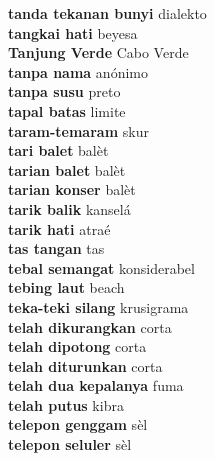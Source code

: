 \textbf{ tanda tekanan bunyi  } dialekto \\
\textbf{ tangkai hati  } beyesa \\
\textbf{ Tanjung Verde  } Cabo Verde \\
\textbf{ tanpa nama  } anónimo \\
\textbf{ tanpa susu  } preto \\
\textbf{ tapal batas  } limite \\
\textbf{ taram-temaram  } skur \\
\textbf{ tari balet  } balèt \\
\textbf{ tarian balet  } balèt \\
\textbf{ tarian konser  } balèt \\
\textbf{ tarik balik  } kanselá \\
\textbf{ tarik hati  } atraé \\
\textbf{ tas tangan  } tas \\
\textbf{ tebal semangat  } konsiderabel \\
\textbf{ tebing laut  } beach \\
\textbf{ teka-teki silang  } krusigrama \\
\textbf{ telah dikurangkan  } corta \\
\textbf{ telah dipotong  } corta \\
\textbf{ telah diturunkan  } corta \\
\textbf{ telah dua kepalanya  } fuma \\
\textbf{ telah putus  } kibra \\
\textbf{ telepon genggam  } sèl \\
\textbf{ telepon seluler  } sèl \\
